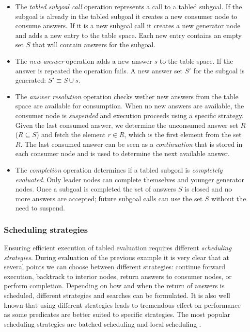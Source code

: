 \begin{itemize}
  \item The \textit{tabled subgoal call} operation represents a call to a tabled subgoal.
  If the subgoal is already in the tabled subgoal it creates a new consumer node to consume answers.
  If it is a new subgoal call it creates a new generator node and adds a new entry to the table space.
  Each new entry contains an empty set $S$ that will contain answers for the subgoal. 
  
  \item The \textit{new answer} operation adds a new answer $s$ to the table space. If the answer is repeated the operation fails.
  A new answer set $S'$ for the subgoal is generated: $S' \equiv S \cup {s}$.
  
  \item The \textit{answer resolution} operation checks wether new answers from the table space are available for consumption.
  When no new answers are available, the consumer node is \textit{suspended} and execution proceeds using a specific strategy.
  Given the last consumed answer, we determine the unconsumed answer
  set $R$ ($R \subseteq S$) and fetch the element $r \in R$, which is the first element from the set $R$. The last consumed answer
  can be seen as a \textit{continuation} that is stored in each consumer node and is used to determine the next available answer.
  
  \item The \textit{completion} operation determines if a tabled subgoal is \textit{completely evaluated}.
  Only leader nodes can complete themselves and younger generator nodes.
  Once a subgoal is completed the set of answers $S$ is closed and no more answers are accepted; future subgoal calls
  can use the set $S$ without the need to suspend.
\end{itemize}

\subsubsection{Scheduling strategies}

Ensuring efficient execution of tabled evaluation requires different \textit{scheduling strategies}.
During evaluation of the previous example it is very clear that at several points we can choose between
different strategies: continue forward execution, backtrack to interior nodes,
return answers to consumer nodes, or perform completion. Depending on how and when the return of answers is scheduled, different
strategies and searches can be formulated. It is also well known
that using different strategies leads to tremendous effect on performance as some predicates are better suited to specific strategies. 
The most popular scheduling strategies are batched scheduling and local scheduling \cite{Freire-96}.

